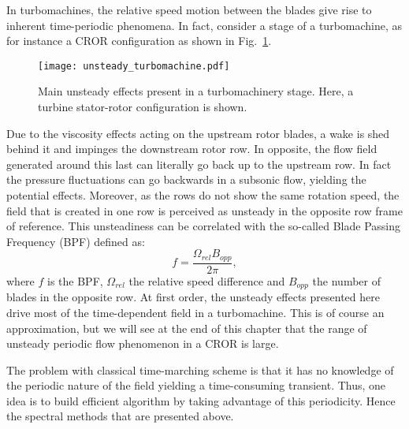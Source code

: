 In turbomachines, the relative speed motion between the blades
give rise to inherent time-periodic phenomena.
In fact, consider a stage of a turbomachine, as for instance
a CROR configuration as shown 
in Fig.~\ref{fig:sm_unsteady_turbomachine}. 
\begin{figure}[htbp]
  \centering
  \texttt{[image: unsteady\_turbomachine.pdf]}
  \caption{Main unsteady effects present in a turbomachinery stage. Here, a turbine stator-rotor
  configuration is shown.}
  \label{fig:sm_unsteady_turbomachine}
\end{figure}
Due to the
viscosity effects acting on the upstream rotor blades, 
a wake is shed behind it and 
impinges the downstream rotor row. 
In opposite, the flow field
generated around this last can literally go back up
to the upstream row. In fact
the pressure fluctuations can go backwards in a subsonic flow, yielding
the potential effects. Moreover, as the rows do not 
show the same rotation speed,
the field that is created in one row is perceived as unsteady in the opposite 
row frame of reference. This unsteadiness can be
correlated with the so-called Blade Passing Frequency (BPF) defined as:
\begin{equation}
	f = \frac{\Omega_{rel} B_{opp}}{2 \pi},
\end{equation}
where $f$ is the BPF, $\Omega_{rel}$ the relative speed difference 
and $B_{opp}$ the number of blades in the opposite row.
At first order, the unsteady effects presented here drive
most of the time-dependent field in a turbomachine. This 
is of course an approximation, but we will see at the end
of this chapter that the range of unsteady periodic
flow phenomenon in a CROR is large.

The problem with classical time-marching scheme is 
that it has no knowledge
of the periodic nature of the field yielding a time-consuming
transient. Thus, one idea is to build efficient algorithm
by taking advantage of this periodicity. 
Hence the spectral methods that are
presented above.

